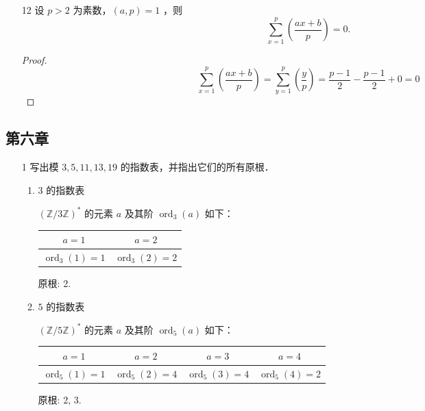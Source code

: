 \begin{enumerate}
    \item[12] 设 $p>2$ 为素数，$(a, p)=1$ ，则
    $$
    \sum_{x=1}^p\left(\frac{a x+b}{p}\right)=0 .
    $$

\begin{proof}
  $$\sum_{x=1}^p\left(\frac{ax+b}{p}\right) = \sum_{y=1}^p\left(\frac{y}{p}\right) = \frac{p-1}{2} - \frac{p-1}{2} + 0 = 0$$
\end{proof}
\end{enumerate}

\subsection*{第六章}

\begin{enumerate}
    \item[1] 写出模 $3,5,11,13,19$ 的指数表，并指出它们的所有原根．

\begin{solution}
    \begin{enumerate}
        \item $3$ 的指数表
        
        $(\mathbb{Z}/3\mathbb{Z})^*$ 的元素 $a$ 及其阶 $\operatorname{ord}_3(a)$ 如下：
            \begin{center}
            \begin{tabular}{|c|c|}
            \hline
            $a=1$ & $a=2$ \\
            \hline
            $\operatorname{ord}_3(1)=1$ & $\operatorname{ord}_3(2)=2$ \\
            \hline
            \end{tabular}
            \end{center}
            原根: 2.

        \item $5$ 的指数表

$(\mathbb{Z}/5\mathbb{Z})^*$ 的元素 $a$ 及其阶 $\operatorname{ord}_5(a)$ 如下：
            \begin{center}
            \begin{tabular}{|c|c|c|c|}
            \hline
            $a=1$ & $a=2$ & $a=3$ & $a=4$ \\
            \hline
            $\operatorname{ord}_5(1)=1$ & $\operatorname{ord}_5(2)=4$ & $\operatorname{ord}_5(3)=4$ & $\operatorname{ord}_5(4)=2$ \\
            \hline
            \end{tabular}
            \end{center}
            原根: 2, 3.


\end{enumerate}
\end{solution}
\end{enumerate}
